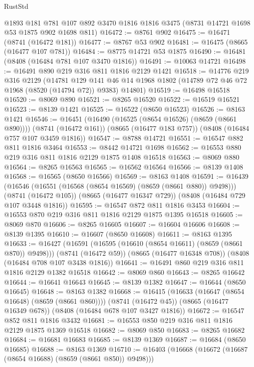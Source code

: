 \begin{lexlean}{RustStd}
\begin{coremodule}
    @1893
    @181
    @781
    @107
    @892
    @3470
    @1816
    @1816
    @3475
    (@8731 @14721 @1698 @53 @1875 @902 @1698 @811)
@16472 := @8761 @902
@16475 := @16471 (@8741 (@16472 @181))
@16477 := @8767 @53 @902
@16481 := @16475 (@8665 (@16477 @107 @781))
@16484 := @8775 @14721 @53 @1875
@16490 := @16481 (@8408 (@16484 @781 @107 @3470 @1816))
@16491 := @10063 @14721
@16498 := @16491 @890 @219 @316 @811 @1816 @2129 @1421
@16518 := @14776
    @219
    @316
    @2129
    (@14781
      @129
      @141
      @46
      @14
      @1968
      @1802
      (@14789 @72 @46 @72 @1968 (@8520 (@14794 @72)) @9383)
      @14801)
@16519 := @16498 @16518
@16520 := @8069 @890
@16521 := @8265 @16520
@16522 := @16519 @16521
@16523 := @8139 @1421
@16525 := @16522 (@8650 @16523)
@16526 := @8163 @1421
@16546 := @16451
    (@16490 (@16525 (@8654 @16526) (@8659 (@8661 @890))))
    (@8741 (@16472 @161))
    (@8665 (@16477 @183 @757))
    (@8408 (@16484 @757 @107 @3459 @1816))
@16547 := @8788 @14721
@16551 := @16547 @882 @811 @1816 @3464
@16553 := @8442 @14721 @1698
@16562 := @16553 @880 @219 @316 @811 @1816 @2129 @1875 @1408 @16518
@16563 := @8069 @880
@16564 := @8265 @16563
@16565 := @16562 @16564
@16566 := @8139 @1408
@16568 := @16565 (@8650 @16566)
@16569 := @8163 @1408
@16591 := @16439
    (@16546 (@16551 (@16568 (@8654 @16569) (@8659 (@8661 @880)) @9498)))
    (@8741 (@16472 @105))
    (@8665 (@16477 @16347 @729))
    (@8408 (@16484 @729 @107 @3448 @1816))
@16595 := @16547 @872 @811 @1816 @3453
@16604 := @16553 @870 @219 @316 @811 @1816 @2129 @1875 @1395 @16518
@16605 := @8069 @870
@16606 := @8265 @16605
@16607 := @16604 @16606
@16608 := @8139 @1395
@16610 := @16607 (@8650 @16608)
@16611 := @8163 @1395
@16633 := @16427
    (@16591 (@16595 (@16610 (@8654 @16611) (@8659 (@8661 @870)) @9498)))
    (@8741 (@16472 @59))
    (@8665 (@16477 @16348 @708))
    (@8408 (@16484 @708 @107 @3438 @1816))
@16641 := @16491 @860 @219 @316 @811 @1816 @2129 @1382 @16518
@16642 := @8069 @860
@16643 := @8265 @16642
@16644 := @16641 @16643
@16645 := @8139 @1382
@16647 := @16644 (@8650 @16645)
@16648 := @8163 @1382
@16668 := @16415
    (@16633 (@16647 (@8654 @16648) (@8659 (@8661 @860))))
    (@8741 (@16472 @45))
    (@8665 (@16477 @16349 @678))
    (@8408 (@16484 @678 @107 @3427 @1816))
@16672 := @16547 @852 @811 @1816 @3432
@16681 := @16553 @850 @219 @316 @811 @1816 @2129 @1875 @1369 @16518
@16682 := @8069 @850
@16683 := @8265 @16682
@16684 := @16681 @16683
@16685 := @8139 @1369
@16687 := @16684 (@8650 @16685)
@16688 := @8163 @1369
@16710 := @16403
    (@16668 (@16672 (@16687 (@8654 @16688) (@8659 (@8661 @850)) @9498)))

\end{coremodule}
\end{lexlean}

